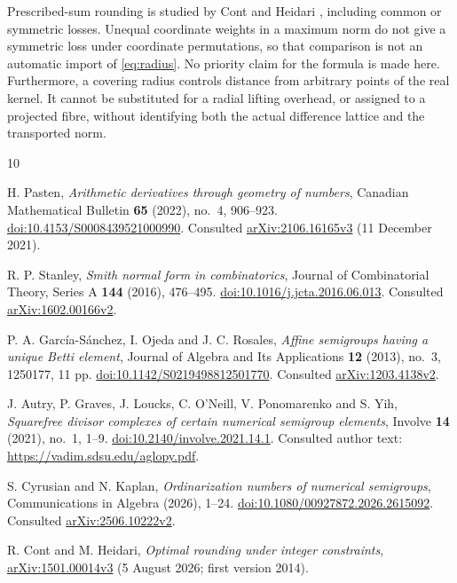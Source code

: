 \documentclass[11pt,a4paper]{article}
\theoremstyle{definition}\newtheorem{question}[theorem]{Question}
\theoremstyle{remark}\newtheorem{remark}[theorem]{Remark}
\begin{document}
Prescribed-sum rounding is studied by Cont and Heidari
\cite[\S\S3.1--3.5]{ContHeidari}, including common or symmetric losses.
Unequal coordinate weights in a maximum norm do not give a symmetric
loss under coordinate permutations, so that comparison is not an
automatic import of \eqref{eq:radius}.
No priority claim for the formula is made here.
Furthermore, a covering radius controls distance from arbitrary points
of the real kernel. It cannot be substituted for a radial lifting
overhead, or assigned to a projected fibre, without identifying both
the actual difference lattice and the transported norm.

\begin{thebibliography}{10}\raggedright
{}
H. Pasten, \emph{Arithmetic derivatives through geometry of numbers},
Canadian Mathematical Bulletin \textbf{65} (2022), no.~4, 906--923.
\href{https://doi.org/10.4153/S0008439521000990}{doi:10.4153/S0008439521000990}.
Consulted \href{https://arxiv.org/abs/2106.16165v3}{arXiv:2106.16165v3}
(11 December 2021).

R. P. Stanley, \emph{Smith normal form in combinatorics},
Journal of Combinatorial Theory, Series A \textbf{144} (2016), 476--495.
\href{https://doi.org/10.1016/j.jcta.2016.06.013}{doi:10.1016/j.jcta.2016.06.013}.
Consulted \href{https://arxiv.org/abs/1602.00166v2}{arXiv:1602.00166v2}.

P. A. Garc\'ia-S\'anchez, I. Ojeda and J. C. Rosales,
\emph{Affine semigroups having a unique Betti element},
Journal of Algebra and Its Applications \textbf{12} (2013), no.~3,
1250177, 11 pp.
\href{https://doi.org/10.1142/S0219498812501770}{doi:10.1142/S0219498812501770}.
Consulted \href{https://arxiv.org/abs/1203.4138v2}{arXiv:1203.4138v2}.

J. Autry, P. Graves, J. Loucks, C. O'Neill, V. Ponomarenko and S. Yih,
\emph{Squarefree divisor complexes of certain numerical semigroup elements},
Involve \textbf{14} (2021), no.~1, 1--9.
\href{https://doi.org/10.2140/involve.2021.14.1}{doi:10.2140/involve.2021.14.1}.
Consulted author text: \url{https://vadim.sdsu.edu/aglopy.pdf}.

S. Cyrusian and N. Kaplan, \emph{Ordinarization numbers of numerical semigroups},
Communications in Algebra (2026), 1--24.
\href{https://doi.org/10.1080/00927872.2026.2615092}{doi:10.1080/00927872.2026.2615092}.
Consulted \href{https://arxiv.org/abs/2506.10222v2}{arXiv:2506.10222v2}.

R. Cont and M. Heidari, \emph{Optimal rounding under integer constraints},
\href{https://arxiv.org/abs/1501.00014v3}{arXiv:1501.00014v3}
(5 August 2026; first version 2014).


\end{thebibliography}
\end{document}
